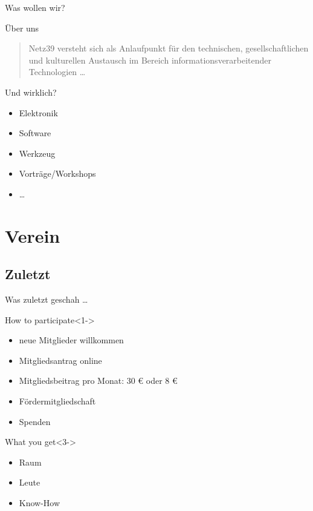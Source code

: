 \documentclass[hyperref={pdfpagelabels=false}]{beamer}
\begin{document}
\begin{frame}{Was wollen wir?}
    \begin{block}{Über uns}
        \begin{quote}
            Netz39 versteht sich als Anlaufpunkt für den technischen,
            gesellschaftlichen und kulturellen Austausch im Bereich
            informationsverarbeitender Technologien …
        \end{quote}
    \end{block}
    \begin{block}{Und wirklich?}
        \begin{itemize}
            \item Elektronik
            \item Software
            \item Werkzeug
            \item Vorträge/Workshops
            \item …
        \end{itemize}
    \end{block}
\end{frame}

\section{Verein}

\subsection{Zuletzt}

\begin{frame}[label=secbaellebad]{Was zuletzt geschah …}
    \begin{block}{How to participate}<1->
        \begin{itemize}
            \item neue Mitglieder willkommen
            \item Mitgliedsantrag online
            \item Mitgliedsbeitrag pro Monat: 30 € oder 8 €
            \pause
            \item Fördermitgliedschaft
            \item Spenden
        \end{itemize}
    \end{block}
    \begin{block}{What you get}<3->
        \begin{itemize}
            \item Raum
            \item Leute
            \item Know-How
        \end{itemize}
    \end{block}
\end{frame}
\end{document}

